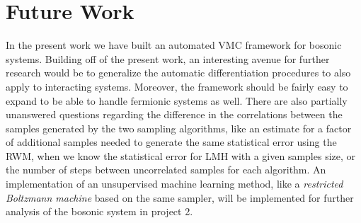 \section{Future Work}\label{sec:Future}

In the present work we have built an automated VMC framework for bosonic systems. Building off of the present work, an interesting avenue for further research would be to generalize the automatic differentiation procedures to also apply to interacting systems. Moreover, the framework should be fairly easy to expand to be able to handle fermionic systems as well. There are also partially unanswered questions regarding the difference in the correlations between the samples generated by the two sampling algorithms, like an estimate for a factor of additional samples needed to generate the same statistical error using the RWM, when we know the statistical error for LMH with a given samples size, or the number of steps between uncorrelated samples for each algorithm. An implementation of an unsupervised machine learning method, like a \textit{restricted Boltzmann machine} based on the same sampler, will be implemented for further analysis of the bosonic system in project 2.  

